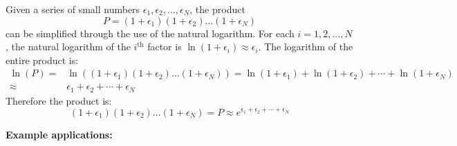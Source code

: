 \documentclass{article}
\begin{document}
\vspace{5mm}

Given a series of small numbers \(\epsilon_1, \epsilon_2, ..., \epsilon_N\), the product 
\[P = (1 + \epsilon_1)(1 + \epsilon_2)...(1 + \epsilon_N)\]
can be simplified through the use of the natural logarithm. For each \(i = 1, 2, ..., N\), the natural logarithm of the \(i^\text{th}\) factor is \(\ln(1 + \epsilon_i) \approx \epsilon_i\). The logarithm of the entire product is:
\begin{align*}
\ln(P) = & \ln((1 + \epsilon_1)(1 + \epsilon_2)...(1 + \epsilon_N)) 
= \ln(1 + \epsilon_1) + \ln(1 + \epsilon_2) + \cdots + \ln(1 + \epsilon_N) \\
\approx & \epsilon_1 + \epsilon_2 + \cdots + \epsilon_N
\end{align*}
Therefore the product is:
\[(1 + \epsilon_1)(1 + \epsilon_2)...(1 + \epsilon_N) = P \approx e^{\epsilon_1 + \epsilon_2 + \cdots + \epsilon_N}\]  

\vspace{5mm}



\textbf{Example applications:}
\end{document}
